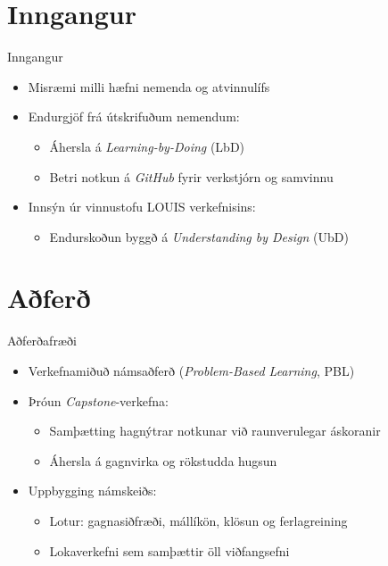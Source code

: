 \documentclass[
    NAME={Dr. Helga Ingimundardóttir},
    EMAIL={helgaingim@hi.is},
    FACULTY={Iðnaðarverkfræði},
    TITLE={Endurskoðun á námskeiði í Viðskiptagreind: },
    SUBTITLE={Hagnýt hæfni í brennidepli},
    SEMINAR={Ráðstefna kennsluakademíunnar},
    DATE={22 nóvember, 2024},
    WIDE={true},
    ICELANDIC={true}
]{HI-LaTeX/hi-beamer}
\begin{document}
\section{Inngangur}
\begin{frame}{Inngangur}
    \begin{itemize}
        \item Misræmi milli hæfni nemenda og atvinnulífs
        \item Endurgjöf frá útskrifuðum nemendum:
        \begin{itemize}
            \item Áhersla á \textit{Learning-by-Doing} (LbD)
            \item Betri notkun á \textit{GitHub} fyrir verkstjórn og samvinnu
        \end{itemize}
        \item Innsýn úr vinnustofu LOUIS verkefnisins:
        \begin{itemize}
            \item Endurskoðun byggð á \textit{Understanding by Design} (UbD)
        \end{itemize}
    \end{itemize}
\end{frame}

\section{Aðferð}
\begin{frame}{Aðferðafræði}
    \begin{itemize}
        \item Verkefnamiðuð námsaðferð (\textit{Problem-Based Learning}, PBL)
        \item Þróun \textit{Capstone}-verkefna:
        \begin{itemize}
            \item Samþætting hagnýtrar notkunar við raunverulegar áskoranir
            \item Áhersla á gagnvirka og rökstudda hugsun
        \end{itemize}
        \item Uppbygging námskeiðs:
        \begin{itemize}
            \item Lotur: gagnasiðfræði, mállíkön, klösun og ferlagreining
            \item Lokaverkefni sem samþættir öll viðfangsefni
        \end{itemize}
    \end{itemize}
\end{frame}
\end{document}

